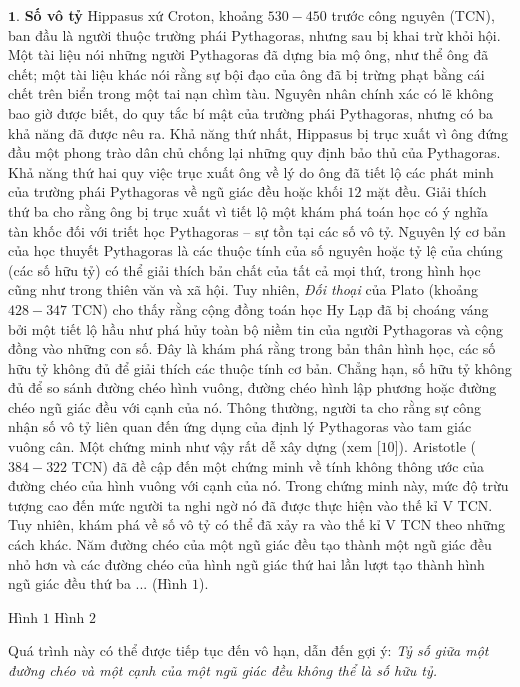 \begin{multicols}{2}
	$\pmb{1.}$ \textbf{Số vô tỷ}
	\vskip 0.1cm
	Hippasus xứ Croton, khoảng $530-450$ trước công nguyên (TCN), ban đầu là người thuộc trường phái Pythagoras, nhưng sau bị khai trừ khỏi hội. Một tài liệu nói những người Pythagoras đã dựng bia mộ ông, như thể ông đã chết; một tài liệu khác nói rằng sự bội đạo của ông đã bị trừng phạt bằng cái chết trên biển trong một tai nạn chìm tàu. Nguyên nhân chính xác có lẽ không bao giờ được biết, do quy tắc bí mật của trường phái Pythagoras, nhưng có ba khả năng đã được nêu ra. 
	\vskip 0.1cm
	Khả năng thứ nhất, Hippasus bị trục xuất vì ông đứng đầu một phong trào dân chủ chống lại những quy định bảo thủ của Pythagoras.
	\vskip 0.1cm
	Khả năng thứ hai quy việc trục xuất ông về lý do ông đã tiết lộ các phát minh của trường phái Pythagoras về ngũ giác đều hoặc khối $12$ mặt đều. 
	\vskip 0.1cm
	Giải thích thứ ba cho rằng ông bị trục xuất vì tiết lộ một khám phá toán học có ý nghĩa tàn khốc đối với triết học Pythagoras -- sự tồn tại các số vô tỷ.
	\vskip 0.1cm
	Nguyên lý cơ bản của học thuyết Pythagoras là các thuộc tính của số nguyên hoặc tỷ lệ của chúng (các số hữu tỷ) có thể giải thích bản chất của tất cả mọi thứ, trong hình học cũng như trong thiên văn và xã hội. Tuy nhiên, \textit{Đối thoại} của Plato (khoảng $428-347$ TCN) cho thấy rằng cộng đồng toán học Hy Lạp đã bị choáng váng bởi một tiết lộ hầu như phá hủy toàn bộ niềm tin của người Pythagoras và cộng đồng vào những con số. Đây là khám phá rằng trong bản  thân hình học, các số hữu tỷ không đủ để giải thích các thuộc tính cơ bản. Chẳng hạn, số hữu tỷ không đủ để so sánh đường chéo hình vuông, đường chéo hình lập phương hoặc đường chéo ngũ giác đều với cạnh của nó. 
	\vskip 0.1cm
	Thông thường, người ta cho rằng sự công nhận số vô tỷ liên quan đến ứng dụng của định lý Pythagoras vào tam giác vuông cân. Một chứng minh như vậy rất dễ xây dựng (xem [$10$]). Aristotle ($384-322$ TCN) đã đề cập đến một chứng minh về tính không thông ước của đường chéo của hình vuông với cạnh của nó. Trong chứng minh này, mức độ trừu tượng cao đến mức người ta nghi ngờ nó đã được thực hiện vào thế kỉ V TCN. Tuy nhiên,  khám phá về số vô tỷ có thể đã xảy ra vào thế kỉ V TCN theo những cách khác. 
	\vskip 0.1cm
	Năm đường chéo của một ngũ giác đều tạo thành một ngũ giác đều nhỏ hơn và các đường chéo của hình ngũ giác thứ hai lần lượt tạo thành hình ngũ giác đều thứ ba ... (Hình $1$).
	
	Hình $1$		Hình $2$

	Quá trình này có thể được tiếp tục đến vô hạn, dẫn đến gợi ý: \textit{Tỷ số giữa một đường chéo và một cạnh của một ngũ giác đều không thể là số hữu tỷ.} 
	

\end{multicols}
